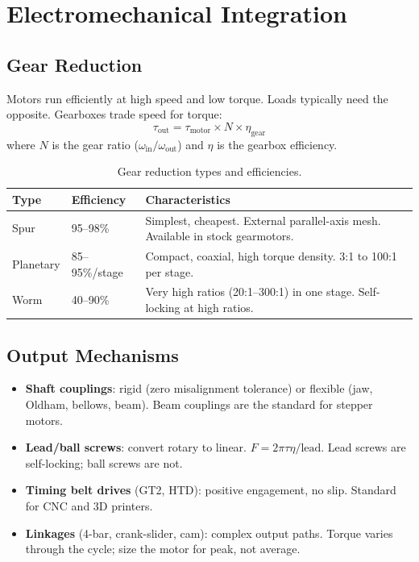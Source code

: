 \section{Electromechanical Integration}
\label{sec:mechint}



\subsection{Gear Reduction}

Motors run efficiently at high speed and low torque. Loads typically need the opposite. Gearboxes trade speed for torque:
\begin{equation}
  \tau_{\text{out}} = \tau_{\text{motor}} \times N \times \eta_{\text{gear}}
\end{equation}
where $N$ is the gear ratio ($\omega_{\text{in}} / \omega_{\text{out}}$) and $\eta$ is the gearbox efficiency.

\begin{table}[htbp]
\centering\small
\begin{tabularx}{\textwidth}{l l X}
  \toprule
  \textbf{Type} & \textbf{Efficiency} & \textbf{Characteristics} \\
  \midrule
  Spur & 95--98\% & Simplest, cheapest. External parallel-axis mesh. Available in stock gearmotors. \\
  Planetary & 85--95\%/stage & Compact, coaxial, high torque density. 3:1 to 100:1 per stage. \\
  Worm & 40--90\% & Very high ratios (20:1--300:1) in one stage. Self-locking at high ratios. \\
  \bottomrule
\end{tabularx}
\caption{Gear reduction types and efficiencies.}
\end{table}

\subsection{Output Mechanisms}

\begin{itemize}[leftmargin=1.5em]
  \item \textbf{Shaft couplings}: rigid (zero misalignment tolerance) or flexible (jaw, Oldham, bellows, beam). Beam couplings are the standard for stepper motors.
  \item \textbf{Lead/ball screws}: convert rotary to linear. $F = 2\pi \tau \eta / \text{lead}$. Lead screws are self-locking; ball screws are not.
  \item \textbf{Timing belt drives} (GT2, HTD): positive engagement, no slip. Standard for CNC and 3D printers.
  \item \textbf{Linkages} (4-bar, crank-slider, cam): complex output paths. Torque varies through the cycle; size the motor for peak, not average.
\end{itemize}

